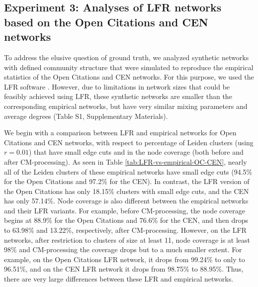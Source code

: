 \documentclass[11pt]{article}   	%
\begin{document}


\subsection{Experiment 3: Analyses of LFR networks based on the Open Citations and CEN networks}

To address the elusive question of ground truth, we analyzed synthetic networks with defined community structure that were simulated to reproduce the empirical statistics of the Open Citations and CEN networks. For this purpose,
we used the LFR software \cite{lancichinetti2008benchmark}. However, due to limitations in network sizes that could be feasibly achieved using LFR, these synthetic networks are smaller than the corresponding
empirical networks, but have very similar mixing parameters and average degrees (Table S1, Supplementary Materials).


We begin with a comparison  between LFR and empirical networks for Open Citations and CEN networks, with respect to percentage of  Leiden clusters (using $r=0.01$) that have small edge cuts and in
the node coverage (both before and after CM-processing).   As seen in
Table \ref{tab:LFR-vs-empirical-OC-CEN}, nearly all of the Leiden clusters of these empirical networks have small edge cuts (94.5\% for the Open Citations and 97.2\% for the CEN).
In contrast,  the LFR version of the Open Citations has only 18.15\% clusters with small edge cuts, and the CEN has only 57.14\%.
Node coverage is also different between the empirical networks and their LFR variants.
For example, before CM-processing, the node coverage begins at 88.9\% for the Open Citations and 76.6\% for the CEN, and then drops to 63.98\% and 13.22\%, respectively, after CM-processing.
However, on the LFR networks, after restriction to clusters of size at least 11, node coverage is at least 98\%  and CM-processing the coverage drops but to a much smaller
extent. For example, on the Open Citations LFR network, it drops from 99.24\% to only to 96.51\%, and on the CEN LFR network it drops from 98.75\% to 88.95\%.
Thus, there are very large differences between these LFR and empirical networks.
\end{document}
